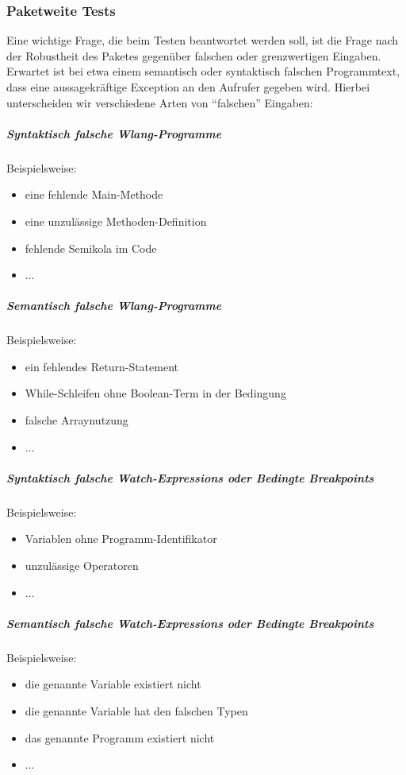 \documentclass[parskip=full]{scrartcl}
\begin{document}
\subsubsection{Paketweite Tests}
Eine wichtige Frage, die beim Testen beantwortet werden soll, ist die Frage nach der Robustheit des Paketes gegenüber falschen oder grenzwertigen Eingaben. Erwartet ist bei etwa einem semantisch oder syntaktisch falschen Programmtext, dass eine aussagekräftige Exception an den Aufrufer gegeben wird. Hierbei unterscheiden wir verschiedene Arten von \enquote{falschen} Eingaben:
\subparagraph{Syntaktisch falsche Wlang-Programme}
Beispielsweise:
\begin{itemize}
\item eine fehlende Main-Methode
\item eine unzulässige Methoden-Definition
\item fehlende Semikola im Code
\item ...
\end{itemize}

\subparagraph{Semantisch falsche Wlang-Programme}
Beispielsweise:
\begin{itemize}
\item ein fehlendes Return-Statement
\item While-Schleifen ohne Boolean-Term in der Bedingung
\item falsche Arraynutzung
\item ...
\end{itemize}

\subparagraph{Syntaktisch falsche Watch-Expressions oder Bedingte Breakpoints}
Beispielsweise:
\begin{itemize}
\item Variablen ohne Programm-Identifikator
\item unzulässige Operatoren
\item ...
\end{itemize}
\subparagraph{Semantisch falsche Watch-Expressions oder Bedingte Breakpoints}
Beispielsweise:
\begin{itemize}
\item die genannte Variable existiert nicht
\item die genannte Variable hat den falschen Typen
\item das genannte Programm existiert nicht
\item ...
\end{itemize}
\end{document}

